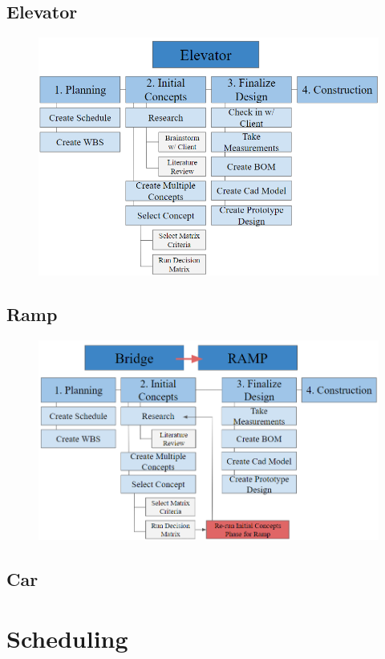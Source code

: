 \documentclass[fleqn,12pt]{project}
\begin{document}
\subsection{Elevator}
\begin{figure}[h!]\centering
\includegraphics[width=13cm]{Elevator WBS.png}
\end{figure}

\subsection{Ramp}
\begin{figure}[h!]\centering
\includegraphics[width=13cm]{Ramp WBS.png}
\end{figure}

\subsection{Car}
\section{Scheduling}
\end{document}
